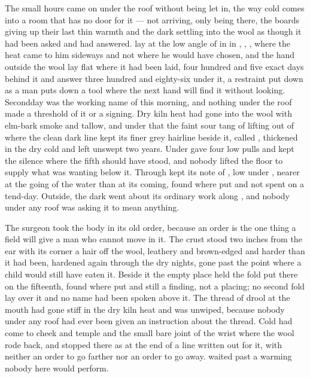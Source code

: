 
The small hours came on under the roof without being let in, the way cold comes into a room that has no door for it --- not arriving, only being there, the boards giving up their last thin warmth and the dark settling into the wool as though it had been asked and had answered.  lay at the low angle of  in  in , , , where the heat came to him sideways and not where he would have chosen, and the hand outside the wool lay flat where it had been laid, four hundred and five exact days behind it and answer three hundred and eighty-six under it, a restraint put down as a man puts down a tool where the next hand will find it without looking. Secondday was the working name of this morning, and nothing under the roof made a threshold of it or a signing. Dry kiln heat had gone into the wool with elm-bark smoke and tallow, and under that the faint sour tang of  lifting out of  where the clean dark line kept its finer grey hairline beside it, called , thickened in the dry cold and left unswept two years. Under   gave four low pulls and kept the silence where the fifth should have stood, and nobody lifted the floor to supply what was wanting below it. Through   kept its note of , low under , nearer at the going of the water than at its coming, found where put and not spent on a tend-day. Outside, the dark went about its ordinary work along , and nobody under any roof was asking it to mean anything.

The surgeon took the body in its old order, because an order is the one thing a field will give a man who cannot move in it. The crust stood two inches from the ear with its corner a hair off the wool, leathery and brown-edged and harder than it had been, hardened again through the dry nights, gone past the point where a child would still have eaten it. Beside it the empty place held the fold put there on the fifteenth, found where put and still a finding, not a placing; no second fold lay over it and no name had been spoken above it. The thread of drool at the mouth had gone stiff in the dry kiln heat and was unwiped, because nobody under any roof had ever been given an instruction about the thread. Cold had come to cheek and temple and the small bare joint of the wrist where the wool rode back, and stopped there as at the end of a line written out for it, with neither an order to go farther nor an order to go away.  waited past a warming nobody here would perform.

